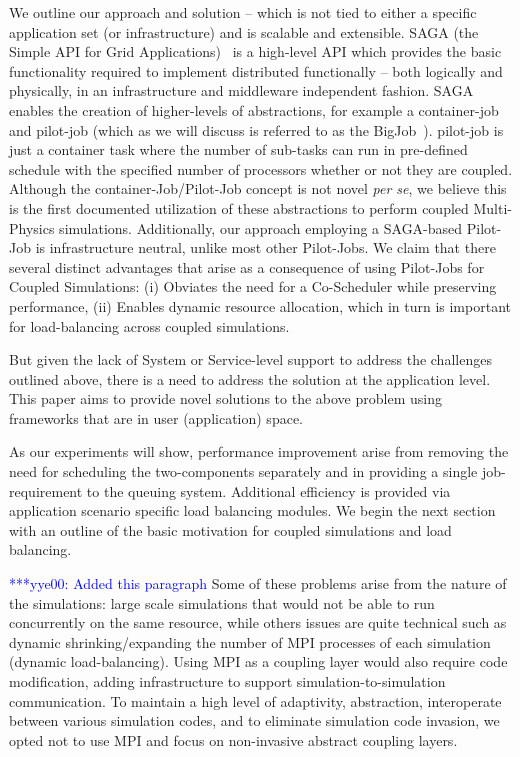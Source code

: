 \documentclass[conference,final]{IEEEtran}
\newcommand{\yyenote}[1]{ {\textcolor{blue} { ***yye00: #1 }}}
\begin{document}
We outline our approach and solution -- which is not tied to either a
specific application set (or infrastructure) and is scalable and
extensible. SAGA (the Simple API for Grid
Applications)~\cite{saga_web} is a high-level API which provides the
basic functionality required to implement distributed functionally --
both logically and physically, in an infrastructure and middleware
independent fashion. SAGA enables the creation of higher-levels of
abstractions, for example a container-job and pilot-job (which as we
will discuss is referred to as the BigJob~\cite{saga_royalsoc}). %
pilot-job is just a container task where the number of sub-tasks can
run in pre-defined schedule with the specified number of processors
whether or not they are coupled. Although the container-Job/Pilot-Job
concept is not novel {\it per se}, we believe this is the first
documented utilization of these abstractions to perform coupled
Multi-Physics simulations. Additionally, our approach employing a
SAGA-based Pilot-Job is infrastructure neutral, unlike most other
Pilot-Jobs. We claim that there several distinct advantages that arise
as a consequence of using Pilot-Jobs for Coupled Simulations: (i)
Obviates the need for a Co-Scheduler while preserving performance,
(ii) Enables dynamic resource allocation, which in turn is important
for load-balancing across coupled simulations.

But given the lack of System or Service-level support to address the
challenges outlined above, there is a need to address the solution at
the application level. This paper aims to provide novel solutions to
the above problem using frameworks that are in user (application)
space.

As our experiments will show, performance improvement arise from
removing the need for scheduling the two-components separately and in
providing a single job-requirement to the queuing system. Additional
efficiency is provided via application scenario specific load
balancing modules. We begin the next section with an outline of the
basic motivation for coupled simulations and load balancing.

\yyenote{Added this paragraph} Some of these problems arise from the
nature of the simulations: large scale simulations that would not be
able to run concurrently on the same resource, while others issues are
quite technical such as dynamic shrinking/expanding the number of MPI
processes of each simulation (dynamic load-balancing). Using MPI as a
coupling layer would also require code modification, adding
infrastructure to support simulation-to-simulation communication. To
maintain a high level of adaptivity, abstraction, interoperate between
various simulation codes, and to eliminate simulation code invasion,
we opted not to use MPI and focus on non-invasive abstract coupling
layers.
\end{document}
